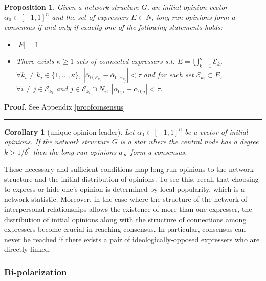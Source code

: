 \documentclass{article}
\newtheorem{corollary}{Corollary}
\newtheorem{proposition}{Proposition}
\newenvironment{proof}[1][Proof]{\textbf{#1.} }{\ \rule{0.5em}{0.5em}}
\begin{document}
\begin{proposition}

Given a network structure $G$, an initial opinion vector $\alpha_{0} \in [-1,1]^n$ and the set of expressers $E \subset N$, long-run opinions form a consensus if and only if exactly one of the following statements holds:
\begin{itemize}
	\item[(i)] $|E|=1$
	\item[(ii)] There exists $\kappa \geq 1$ sets of connected expressers s.t. $E = \bigcup_{k =1}^{\kappa} \mathcal{E}_k$, $\forall k_i \neq k_j \in \{ 1, \ldots , \kappa\}$, $|\overline{\alpha}_{0,\mathcal{E}_{k_i}} - \overline{\alpha}_{0,\mathcal{E}_{k_j}} |< \tau$ and for each set $\mathcal{E}_{k_i} \subset E$, $\forall i \neq j \in  \mathcal{E}_{k_i}$ and $ j \in  \mathcal{E}_{k_i} \cap N_i$, $|\alpha_{0,i} - \alpha_{0,j}| < \tau$.
	
\end{itemize} \label{consensus}
\end{proposition}
\begin{proof} See Appendix \ref{proofconsensus} \end{proof} 

\begin{corollary}[unique opinion leader] Let $\alpha_0 \in [-1,1]^n$ be a vector of initial opinions. If the network structure $G$ is a star where the central node has a degree $k > 1/\delta^{*}$ then the long-run opinions $a_{\infty}$ form a consensus. 
\end{corollary}

\vspace{3mm}
These necessary and sufficient conditions map long-run opinions to the network structure and the initial distribution of opinions. To see this, recall that choosing to express or hide one's opinion is determined by local popularity, which is a network statistic. Moreover, in the case where the structure of the network of interpersonal relationships allows the existence of more than one expresser, the distribution of initial opinions along with the structure of connections among expressers become crucial in reaching consensus. In particular, consensus can never be reached if there exists a pair of ideologically-opposed expressers who are directly linked.  

\subsubsection{Bi-polarization}
\end{document}

